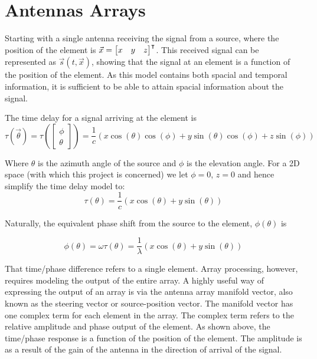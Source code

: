 \section{Antennas Arrays}

Starting with a single antenna receiving the signal from a source, where the position of the element is \(\vec{x} = \begin{bmatrix}x & y & z \end{bmatrix}^\intercal\). 
This received signal can be represented as \(\vec{s}(t, \vec{x})\), showing that the signal at an element is a function of the position of the element.
As this model contains both spacial and temporal information, it is sufficient to be able to attain spacial information about the signal\cite{krim1996two}.

The time delay for a signal arriving at the element is \cite{poisel2012electronic}
\begin{equation}
  \tau(\vec{\theta}) 
 = \tau( \begin{bmatrix} \phi \\ \theta \end{bmatrix} )
 = \frac{1}{c} \left( x\cos(\theta)\cos(\phi) + y\sin(\theta)\cos(\phi) + z\sin(\phi) \right)
\end{equation}

Where \(\theta\) is the azimuth angle of the source and \(\phi\) is the elevation angle.
For a 2D space (with which this project is concerned) we let \(\phi= 0\), \(z = 0\) and hence simplify the time delay model to:
\begin{equation}
  \tau(\theta) = \frac{1}{c} \left( x\cos(\theta) + y\sin(\theta) \right)
\end{equation}

Naturally, the equivalent phase shift from the source to the element, \(\phi(\theta)\) is

\begin{equation}
  \phi(\theta) = \omega\tau(\theta) = \frac{1}{\lambda} \left( x\cos(\theta) + y\sin(\theta) \right)
\end{equation}

That time/phase difference refers to a single element. 
Array processing, however, requires modeling the output of the entire array. 
A highly useful way of expressing the output of an array is via the antenna array manifold vector, also known as the steering vector or source-position vector. 
The manifold vector has one complex term for each element in the array. 
The complex term refers to the relative amplitude and phase output of the element. 
As shown above, the time/phase response is a function of the position of the element. 
The amplitude is as a result of the gain of the antenna in the direction of arrival of the signal. 

